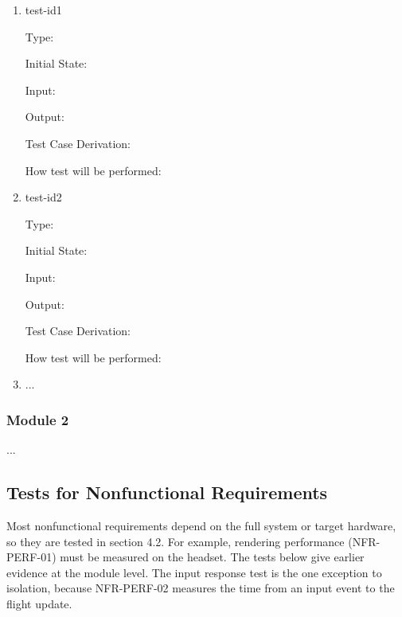 \documentclass[12pt, titlepage]{article}
\begin{document}
\begin{enumerate}

\item{test-id1\\}

Type: 
					
Initial State: 
					
Input: 
					
Output: 

Test Case Derivation: 

How test will be performed: 
					
\item{test-id2\\}

Type: 
					
Initial State: 
					
Input: 
					
Output: 

Test Case Derivation: 

How test will be performed: 

\item{...\\}
    
\end{enumerate}

\subsubsection{Module 2}

...

\subsection{Tests for Nonfunctional Requirements}
\label{sec:unit-nfr}

Most nonfunctional requirements depend on the full system or target hardware, so
they are tested in section 4.2. For example, rendering performance (NFR-PERF-01)
must be measured on the headset. The tests below give earlier evidence at the
module level. The input response test is the one exception to isolation, because
NFR-PERF-02 measures the time from an input event to the flight update.
\end{document}
